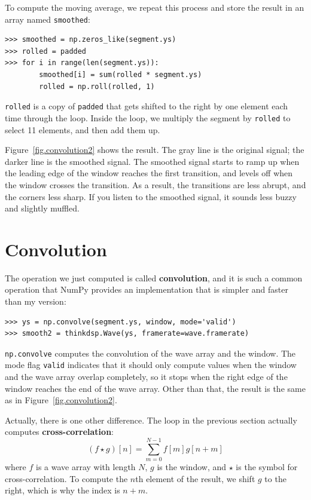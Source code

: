 \documentclass[12pt]{book}
\begin{document}
To compute the moving average, we repeat this process and store
the result in an array named {\tt smoothed}:

\begin{verbatim}
>>> smoothed = np.zeros_like(segment.ys)
>>> rolled = padded
>>> for i in range(len(segment.ys)):
        smoothed[i] = sum(rolled * segment.ys)
        rolled = np.roll(rolled, 1)
\end{verbatim}

{\tt rolled} is a copy of {\tt padded} that gets shifted to
the right by one element each time through the loop.  Inside
the loop, we multiply the segment by {\tt rolled} to select
11 elements, and then add them up.

Figure~\ref{fig.convolution2} shows the result.  The gray line
is the original signal; the darker line is the smoothed signal.
The smoothed signal starts to ramp up when the leading edge of
the window reaches the first transition, and levels off when
the window crosses the transition.  As a result, the transitions
are less abrupt, and the corners less sharp.  If you listen
to the smoothed signal, it sounds less buzzy and slightly muffled.


\section{Convolution}
\label{convolution}

The operation we just computed is called {\bf convolution},
and it is such a common operation that NumPy provides an
implementation that is simpler and faster than my version:

\begin{verbatim}
>>> ys = np.convolve(segment.ys, window, mode='valid')
>>> smooth2 = thinkdsp.Wave(ys, framerate=wave.framerate)
\end{verbatim}

{\tt np.convolve} computes the convolution of the wave
array and the window.  The mode flag {\tt valid} indicates
that it should only compute values when the window and the
wave array overlap completely, so it stops when the right
edge of the window reaches the end of the wave array.  Other
than that, the result is the same as in Figure~\ref{fig.convolution2}.

\newcommand{\conv}{\ast}

Actually, there is one other difference.  The loop in the
previous section actually computes {\bf cross-correlation}:
%
\[ (f \star g)[n] = \sum_{m=0}^{N-1} f[m] g[n+m]  \]
%
where $f$ is a wave array with length $N$, $g$ is the window,
and $\star$ is the symbol for cross-correlation.  To
compute the $n$th element of the result, we shift $g$ to
the right, which is why the index is $n+m$.
\end{document}
